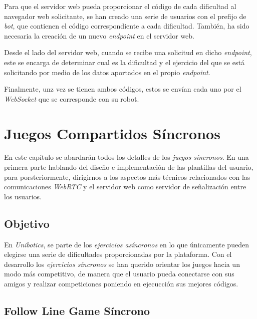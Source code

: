 \documentclass[a4paper, 12pt]{book}
\begin{document}
Para que el servidor web pueda proporcionar el código de cada dificultad al navegador web solicitante, se han creado una serie de usuarios con el prefijo de \emph{bot}, que contienen el código correspondiente a cada dificultad. También, ha sido necesaria la creación de un nuevo \emph{endpoint} en el servidor web.

Desde el lado del servidor web, cuando se recibe una solicitud en dicho \emph{endpoint}, este se encarga de determinar cual es la dificultad y el ejercicio del que se está solicitando por medio de los datos aportados en el propio \emph{endpoint}.

Finalmente, unz vez se tienen ambos códigos, estos se envían cada uno por el \emph{WebSocket} que se corresponde con su robot.


\cleardoublepage
\chapter{Juegos Compartidos Síncronos}

En este capítulo se abardarán todos los detalles de los \emph{juegos síncronos}. En una primera parte hablando del diseño e implementación de las plantillas del usuario, para porsteriormente, dirigirnos a los aspectos más técnicos relacionados con las comunicaciones \emph{WebRTC} y el servidor web como servidor de señalización entre los usuarios.

\section{Objetivo}
\label{sync_objective}

En \emph{Unibotics}, se parte de los \emph{ejercicios asíncronos} en lo que únicamente pueden elegirse una serie de dificultades proporcionadas por la plataforma. Con el desarrollo los \emph{ejercicios síncronos} se han querido orientar los juegos hacia un modo más competitivo, de manera que el usuario pueda conectarse con sus amigos y realizar competiciones poniendo en ejecucción sus mejores códigos.

\section{Follow Line Game Síncrono} 
\label{sec:follow_line_game_sync}
\end{document}
